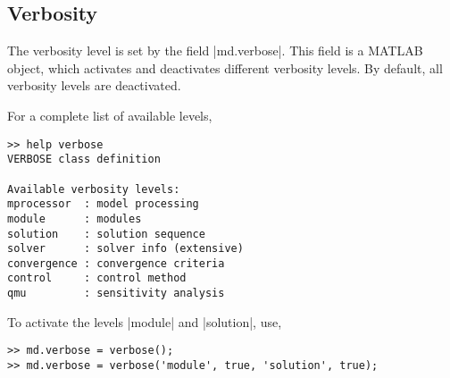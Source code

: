 
\subsection{Verbosity} \label{sec:using-issm-capabilities-verbosity}
The verbosity level is set by the field \lstinlinebg|md.verbose|. This field is a MATLAB object, which activates and deactivates different verbosity levels. By default, all verbosity levels are deactivated.

For a complete list of available levels,
\begin{lstlisting}
>> help verbose
VERBOSE class definition

Available verbosity levels:
mprocessor  : model processing
module      : modules
solution    : solution sequence
solver      : solver info (extensive)
convergence : convergence criteria
control     : control method
qmu         : sensitivity analysis
\end{lstlisting}

To activate the levels \lstinlinebg|module| and \lstinlinebg|solution|, use,
\begin{lstlisting}
>> md.verbose = verbose();
>> md.verbose = verbose('module', true, 'solution', true);
\end{lstlisting}

\clearpage %
